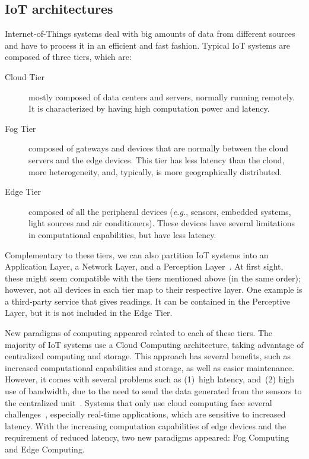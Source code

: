 \subsection{IoT architectures}\label{sec:architectures}

Internet-of-Things systems deal with big amounts of data from different sources and have to process it in an efficient and fast fashion. Typical IoT systems are composed of three tiers, which are:

\begin{description}
    \item[Cloud Tier] mostly composed of data centers and servers, normally running remotely. It is characterized by having high computation power and latency.
    \item[Fog Tier] composed of gateways and devices that are normally between the cloud servers and the edge devices. This tier has less latency than the cloud, more heterogeneity, and, typically, is more geographically distributed.
    \item[Edge Tier] composed of all the peripheral devices (\emph{e.g.}, sensors, embedded systems, light sources and air conditioners). These devices have several limitations in computational capabilities, but have less latency.
\end{description}

Complementary to these tiers, we can also partition IoT systems into an Application Layer, a Network Layer, and a Perception Layer~\cite{iot_layers}. At first sight, these might seem compatible with the tiers mentioned above (in the same order); however, not all devices in each tier map to their respective layer. One example is a third-party service that gives readings. It can be contained in the Perceptive Layer, but it is not included in the Edge Tier.

New paradigms of computing appeared related to each of these tiers. The majority of IoT systems use a Cloud Computing architecture, taking advantage of centralized computing and storage. This approach has several benefits, such as increased computational capabilities and storage, as well as easier maintenance. However, it comes with several problems such as (1)~high latency, and~(2) high use of bandwidth, due to the need to send the data generated from the sensors to the centralized unit~\cite{connecting_fog_and_cloud}. Systems that only use cloud computing face several challenges~\cite{aazam2014cloud}, especially real-time applications, which are sensitive to increased latency. With the increasing computation capabilities of edge devices and the requirement of reduced latency, two new paradigms appeared: Fog Computing and Edge Computing.

